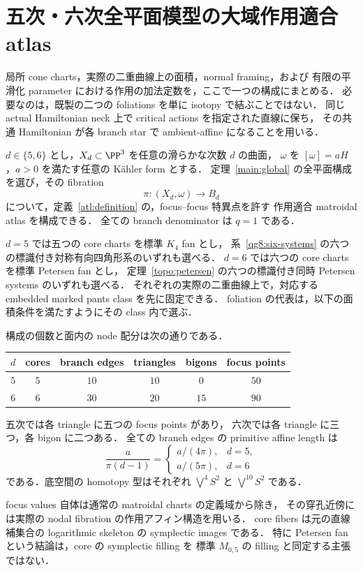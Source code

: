 \section{五次・六次全平面模型の大域作用適合 atlas}
\label{ga8:section}

局所 cone charts，実際の二重曲線上の面積，normal framing，および
有限の平滑化 parameter における作用の加法定数を，ここで一つの構成にまとめる．
必要なのは，既製の二つの foliations を単に isotopy で結ぶことではない．
同じ actual Hamiltonian neck 上で critical actions を指定された直線に保ち，
その共通 Hamiltonian が各 branch star で ambient-affine になることを用いる．

\begin{theorem}
\label{ga8:global}
$d\in\{5,6\}$ とし，$X_d\subset\PP^3$ を任意の滑らかな次数 $d$ の曲面，
$\omega$ を $[\omega]=aH$，$a>0$ を満たす任意の K\"ahler form とする．
定理~\ref{main:global} の全平面構成を選び，その fibration
\[
 \pi:(X_d,\omega)\longrightarrow B_d
\]
について，定義~\ref{atl:definition} の，focus--focus 特異点を許す
作用適合 matroidal atlas を構成できる．
全ての branch denominator は $q=1$ である．

$d=5$ では五つの core charts を標準 $K_4$ fan とし，
系~\ref{qg8:six-systems} の六つの標識付き対称有向四角形系のいずれも選べる．
$d=6$ では六つの core charts を標準 Petersen fan とし，
定理~\ref{topo:petersen} の六つの標識付き同時 Petersen systems のいずれも選べる．
それぞれの実際の二重曲線上で，対応する embedded marked pants class を先に固定できる．
foliation の代表は，以下の面積条件を満たすようにその class 内で選ぶ．

構成の個数と面内の node 配分は次の通りである．
\begin{center}
\begin{tabular}{c|ccccc}
 $d$ & cores & branch edges & triangles & bigons & focus points\\ \hline
 $5$ & $5$ & $10$ & $10$ & $0$ & $50$\\
 $6$ & $6$ & $30$ & $20$ & $15$ & $90$
\end{tabular}
\end{center}
五次では各 triangle に五つの focus points があり，
六次では各 triangle に三つ，各 bigon に二つある．
全ての branch edges の primitive affine length は
\begin{equation}\label{ga8:branch-length}
 \frac{a}{\pi(d-1)}
 =\begin{cases}a/(4\pi),&d=5,\\a/(5\pi),&d=6\end{cases}
\end{equation}
である．底空間の homotopy 型はそれぞれ
$\bigvee^4S^2$ と $\bigvee^{10}S^2$ である．

focus values 自体は通常の matroidal charts の定義域から除き，
その穿孔近傍には実際の nodal fibration の作用アフィン構造を用いる．
core fibers は元の直線補集合の logarithmic skeleton の symplectic images である．
特に Petersen fan という結論は，core の symplectic filling を
標準 $M_{0,5}$ の filling と同定する主張ではない．
\end{theorem}

